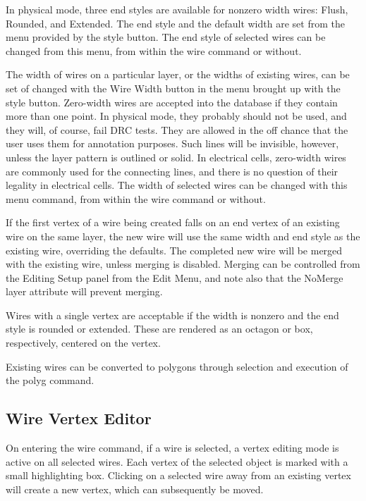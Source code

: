 In physical mode, three end styles are available for nonzero width
wires:  {\et Flush}, {\et Rounded}, and {\et Extended}.  The end style
and the default width are set from the menu provided by the {\cb
style} button.  The end style of selected wires can be changed from
this menu, from within the {\cb wire} command or without.

The width of wires on a particular layer, or the widths of existing
wires, can be set of changed with the {\cb Wire Width} button in the
menu brought up with the {\cb style} button.  Zero-width wires are
accepted into the database if they contain more than one point.  In
physical mode, they probably should not be used, and they will, of
course, fail DRC tests.  They are allowed in the off chance that the
user uses them for annotation purposes.  Such lines will be invisible,
however, unless the layer pattern is outlined or solid.  In electrical
cells, zero-width wires are commonly used for the connecting lines,
and there is no question of their legality in electrical cells.  The
width of selected wires can be changed with this menu command, from
within the {\cb wire} command or without.

If the first vertex of a wire being created falls on an end vertex of
an existing wire on the same layer, the new wire will use the same
width and end style as the existing wire, overriding the defaults. 
The completed new wire will be merged with the existing wire, unless
merging is disabled.  Merging can be controlled from the {\cb Editing
Setup} panel from the {\cb Edit Menu}, and note also that the {\et
NoMerge} layer attribute will prevent merging.

Wires with a single vertex are acceptable if the width is nonzero and
the end style is rounded or extended.  These are rendered as an
octagon or box, respectively, centered on the vertex.

Existing wires can be converted to polygons through selection and
execution of the {\cb polyg} command.

\subsection{Wire Vertex Editor}

On entering the {\cb wire} command, if a wire is selected, a vertex
editing mode is active on all selected wires.  Each vertex of the
selected object is marked with a small highlighting box.  Clicking on
a selected wire away from an existing vertex will create a new vertex,
which can subsequently be moved.

